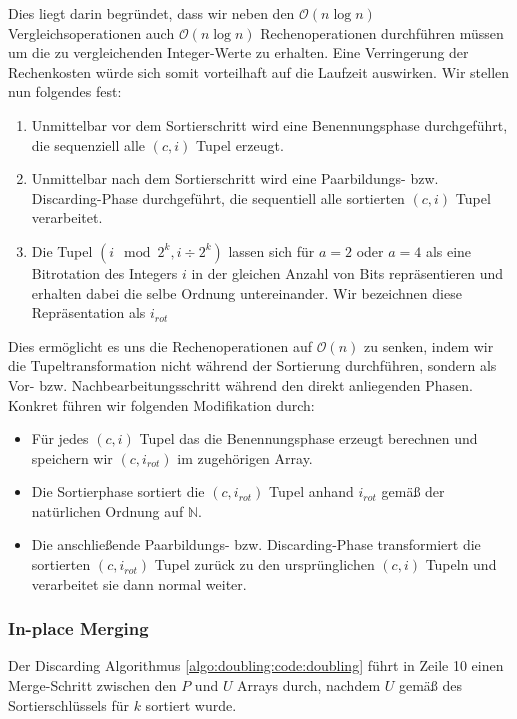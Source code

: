 Dies liegt darin begründet, dass wir neben den $\mathcal{O}(n \log n)$ Vergleichsoperationen auch $\mathcal{O}(n \log n)$ Rechenoperationen durchführen müssen um die zu vergleichenden Integer-Werte zu erhalten. Eine Verringerung der Rechenkosten würde sich somit vorteilhaft auf die Laufzeit auswirken. Wir stellen nun folgendes fest:

\begin{enumerate}
\item Unmittelbar vor dem Sortierschritt wird eine Benennungsphase durchgeführt, die sequenziell alle $(c, i)$ Tupel erzeugt.
\item Unmittelbar nach dem Sortierschritt wird eine Paarbildungs- bzw. Discarding-Phase durchgeführt, die sequentiell alle sortierten $(c, i)$ Tupel verarbeitet.
\item Die Tupel $(i \mod 2^k, i \div 2^k)$ lassen sich für $a = 2$ oder $a = 4$ als eine Bitrotation des Integers $i$ in der gleichen Anzahl von Bits repräsentieren und erhalten dabei die selbe Ordnung untereinander. Wir bezeichnen diese Repräsentation als $i_{rot}$
\end{enumerate}

Dies ermöglicht es uns die Rechenoperationen auf $\mathcal{O}(n)$ zu senken, indem wir die Tupeltransformation nicht während der Sortierung durchführen, sondern als Vor- bzw. Nachbearbeitungsschritt während den direkt anliegenden Phasen. Konkret führen wir folgenden Modifikation durch:

\begin{itemize}
\item Für jedes $(c, i)$ Tupel das die Benennungsphase erzeugt berechnen und speichern wir $(c, i_{rot})$ im zugehörigen Array.
\item Die Sortierphase sortiert die $(c, i_{rot})$ Tupel anhand $i_{rot}$ gemäß der natürlichen Ordnung auf $\mathbb{N}$.
\item Die anschließende Paarbildungs- bzw. Discarding-Phase transformiert die sortierten $(c, i_{rot})$ Tupel zurück zu den ursprünglichen $(c, i)$ Tupeln und verarbeitet sie dann normal weiter.
\end{itemize}

\subsubsection{In-place Merging}

Der Discarding Algorithmus \ref{algo:doubling:code:doubling} führt in Zeile 10 einen Merge-Schritt zwischen den $P$ und $U$ Arrays durch, nachdem $U$ gemäß des Sortierschlüssels für $k$ sortiert wurde. 


